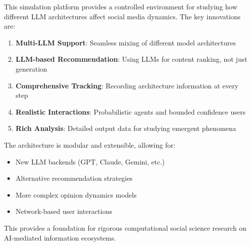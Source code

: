 \documentclass[11pt]{article}
\begin{document}
This simulation platform provides a controlled environment for studying how different LLM architectures affect social media dynamics. The key innovations are:

\begin{enumerate}
    \item \textbf{Multi-LLM Support}: Seamless mixing of different model architectures
    \item \textbf{LLM-based Recommendation}: Using LLMs for content ranking, not just generation
    \item \textbf{Comprehensive Tracking}: Recording architecture information at every step
    \item \textbf{Realistic Interactions}: Probabilistic agents and bounded confidence users
    \item \textbf{Rich Analysis}: Detailed output data for studying emergent phenomena
\end{enumerate}

The architecture is modular and extensible, allowing for:
\begin{itemize}
    \item New LLM backends (GPT, Claude, Gemini, etc.)
    \item Alternative recommendation strategies
    \item More complex opinion dynamics models
    \item Network-based user interactions
\end{itemize}

This provides a foundation for rigorous computational social science research on AI-mediated information ecosystems.
\end{document}

